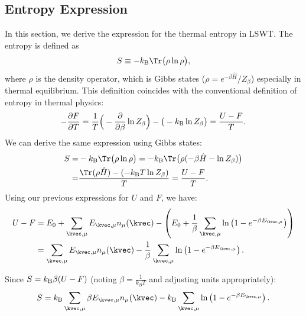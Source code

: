 \subsection{Entropy Expression}\label{subsec: Entropy}
In this section, we derive the expression for the thermal entropy in LSWT. 
The entropy is defined as 
\begin{equation}
    S \equiv -k_{\rm B}\Tr \big( \rho \ln \rho \big),
\end{equation}
where $\rho$ is the density operator, which is Gibbs states ($\rho = e^{-\beta \hat{H}}/Z_{\beta}$) especially in thermal equilibrium.
This definition coincides with the conventional definition of entropy in thermal physics:
\begin{align}
    - \frac{\partial F}{\partial T}
    = \frac{1}{T} \Big(-\frac{\partial}{\partial \beta} \ln Z_{\beta} \Big) - \big(-k_{\rm B} \ln Z_{\beta} \big)
    = \frac{U - F}{T}.
\end{align}
We can derive the same expression using Gibbs states:
\begin{align}
    S = & -k_{\rm B}\Tr \big( \rho \ln \rho \big)
    = -k_{\rm B}\Tr \big( \rho (-\beta \hat{H} - \ln Z_{\beta}) \big) \nonumber \\
    = &  \frac{ \Tr (\rho \hat{H}) - (-k_{\rm B}T\ln Z_{\beta})}{T} 
    = \frac{U - F}{T}.
\end{align}
Using our previous expressions for $U$ and $F$, we have:
\begin{align}
    U - F &= E_0 + \sum_{\kvec, \mu} E_{\kvec, \mu} n_{\mu}(\kvec) - \left( E_0 + \frac{1}{\beta} \sum_{\kvec, \mu} \ln \left( 1 - e^{-\beta E_{\kvec, \mu}} \right) \right) \nonumber \\ 
    &= \sum_{\kvec, \mu} E_{\kvec, \mu} n_{\mu}(\kvec) - \frac{1}{\beta} \sum_{\kvec, \mu} \ln \left( 1 - e^{-\beta E_{\kvec, \mu}} \right).
\end{align}

Since $S = k_{\rm B} \beta (U - F)$ (noting $\beta = \frac{1}{k_B T}$ and adjusting units appropriately):
\begin{equation}
    S = k_{\rm B} \sum_{\kvec, \mu} \beta E_{\kvec, \mu} n_{\mu} (\kvec) - k_{\rm B} \sum_{\kvec, \mu} \ln \left( 1 - e^{-\beta E_{\kvec, \mu}} \right).
\end{equation}

